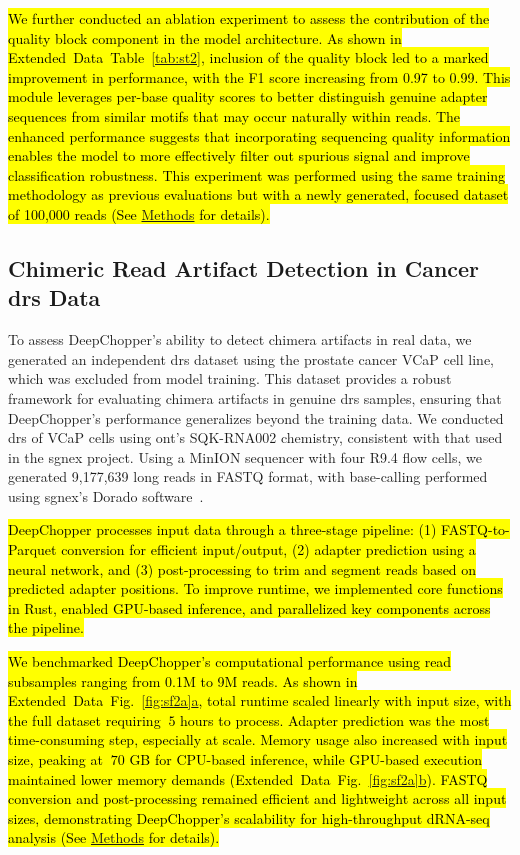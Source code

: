 \documentclass[pdflatex,sn-nature, lineno]{sn-jnl}%
\newcommand{\edfigref}[2]{Extended Data Fig.~\hyperref[#1]{\ref*{#1}#2}}
\newcommand{\edtableref}[2]{Extended Data Table~\hyperref[#1]{\ref*{#1}#2}}
\begin{document}
\hl{We further conducted an ablation experiment to assess the contribution of the quality block component in the model architecture.
	As shown in \mbox{\edtableref{tab:st2}{}}, inclusion of the quality block led to a marked improvement in performance, with the F1 score increasing from 0.97 to 0.99.
	This module leverages per-base quality scores to better distinguish genuine adapter sequences from similar motifs that may occur naturally within reads.
	The enhanced performance suggests that incorporating sequencing quality information enables the model to more effectively filter out spurious signal and improve classification robustness.
	This experiment was performed using the same training methodology as previous evaluations but with a newly generated, focused dataset of 100,000 reads (See \mbox{\hyperref[sec:methods]{Methods}} for details).}

\subsection{Chimeric Read Artifact Detection in Cancer \mbox{\gls{drs}} Data}

To assess DeepChopper’s ability to detect chimera artifacts in real data, we generated an independent \gls{drs} dataset using the prostate cancer VCaP cell line, which was excluded from model training.
This dataset provides a robust framework for evaluating chimera artifacts in genuine \gls{drs} samples, ensuring that DeepChopper’s performance generalizes beyond the training data.
We conducted \gls{drs} of VCaP cells using \gls{ont}’s SQK-RNA002 chemistry, consistent with that used in the \gls{sgnex} project.
Using a MinION sequencer with four R9.4 flow cells, we generated 9,177,639 long reads in FASTQ format, with base-calling performed using \gls{sgnex}’s Dorado software~\cite{dorado2023}.

\hl{DeepChopper processes input data through a three-stage pipeline: (1) FASTQ-to-Parquet conversion for efficient input/output, (2) adapter prediction using a neural network, and (3) post-processing to trim and segment reads based on predicted adapter positions. To improve runtime, we implemented core functions in Rust, enabled GPU-based inference, and parallelized key components across the pipeline.}

\hl{We benchmarked DeepChopper’s computational performance using read subsamples ranging from 0.1M to 9M reads. As shown in \mbox{\edfigref{fig:sf2a}{a}}, total runtime scaled linearly with input size, with the full dataset requiring $~5$ hours to process. Adapter prediction was the most time-consuming step, especially at scale. Memory usage also increased with input size, peaking at $~70$ GB for CPU-based inference, while GPU-based execution maintained lower memory demands (\mbox{\edfigref{fig:sf2a}{b}}). FASTQ conversion and post-processing remained efficient and lightweight across all input sizes, demonstrating DeepChopper's scalability for high-throughput dRNA-seq analysis (See \mbox{\hyperref[sec:methods]{Methods}} for details).}
\end{document}
